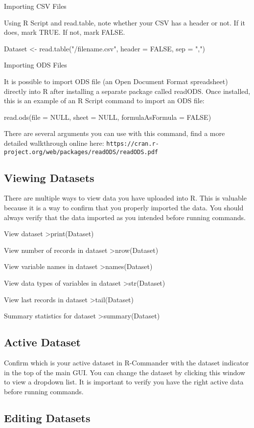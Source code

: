 Importing CSV Files

Using R Script and read.table, note whether your CSV has a header or not. If it does, mark TRUE. If not, mark FALSE.

Dataset <-  read.table("/filename.csv", header = FALSE, sep = ",")

Importing ODS Files

It is possible to import ODS file (an Open Document Format spreadsheet) directly into R after installing a separate package called readODS. Once installed, this is an example of an R Script command to import an ODS file:

read.ods(file = NULL, sheet = NULL, formulaAsFormula = FALSE)

There are several arguments you can use with this command, find a more detailed walkthrough online here: \texttt{https://cran.r-project.org/web/packages/readODS/readODS.pdf}

\subsection{Viewing Datasets}
There are multiple ways to view data you have uploaded into R. This is valuable because it is a way to confirm that you properly imported the data. You should always verify that the data imported as you intended before running commands.

View dataset
>print(Dataset)

View number of records in dataset
>nrow(Dataset)

View variable names in dataset
>names(Dataset)

View data types of variables in dataset
>str(Dataset)

View last records in dataset
>tail(Dataset)

Summary statistics for dataset
>summary(Dataset)

\subsection{Active Dataset}
Confirm which is your active dataset in R-Commander with the dataset indicator in the top of the main GUI. You can change the dataset by clicking this window to view a dropdown list. It is important to verify you have the right active data before running commands.

\subsection{Editing Datasets}